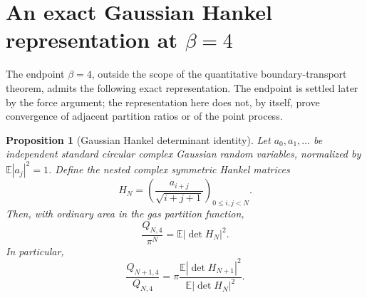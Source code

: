 \documentclass[11pt,a4paper]{article}
\numberwithin{equation}{section}
\newtheorem{proposition}[theorem]{Proposition}
\theoremstyle{definition}
\theoremstyle{remark}
\begin{document}
\section{An exact Gaussian Hankel representation at \texorpdfstring{$\beta=4$}{beta equals 4}}
\label{sec:critical-hankel}

The endpoint $\beta=4$, outside the scope of the quantitative
boundary-transport theorem, admits the following exact
representation. The endpoint is settled later by the force
argument; the representation here does not, by itself,
prove convergence of adjacent partition ratios or of the point process.

\begin{proposition}[Gaussian Hankel determinant identity]
\label{prop:critical-gaussian-hankel}
Let $a_0,a_1,\ldots$ be independent standard circular complex Gaussian
random variables, normalized by $\mathbb E|a_j|^2=1$. Define the nested
complex symmetric Hankel matrices
\[
 H_N=\left(\frac{a_{i+j}}{\sqrt{i+j+1}}\right)_{0\leq i,j<N}.
\]
Then, with ordinary area in the gas partition function,
\begin{equation}
 \frac{Q_{N,4}}{\pi^N}=\mathbb E|\det H_N|^2.
 \label{eq:critical-gaussian-hankel}
\end{equation}
In particular,
\begin{equation}
 \frac{Q_{N+1,4}}{Q_{N,4}}
 =\pi\frac{\mathbb E|\det H_{N+1}|^2}
             {\mathbb E|\det H_N|^2}.
 \label{eq:critical-hankel-adjacent-ratio}
\end{equation}
\end{proposition}
\end{document}
